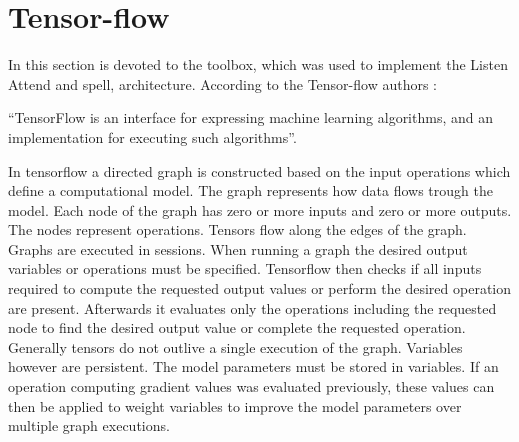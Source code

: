 \section{Tensor-flow}
In this section is devoted to the toolbox, which was used to implement the Listen Attend and spell, architecture. According to the Tensor-flow authors \cite{Agarwal2015}:

\enquote{TensorFlow is an interface for expressing machine learning algorithms, and an implementation for executing such algorithms}.

In tensorflow a directed graph is constructed based on the input operations which define a computational model. The graph represents how data flows trough the model. Each node of the graph has zero or more inputs and zero or more outputs. The nodes represent operations. Tensors flow along the edges of the graph.
Graphs are executed in sessions. When running a graph the desired output variables or operations must be specified. Tensorflow then checks if all inputs required to compute the requested output values or perform the desired operation are present. Afterwards it evaluates only the operations including the requested node to find the desired output value or complete the requested operation.
Generally tensors do not outlive a single execution of the graph. Variables however are persistent. The model parameters must be stored in variables. If an operation computing gradient values was evaluated previously, these values can then be applied to weight variables to improve the model parameters over multiple graph executions.